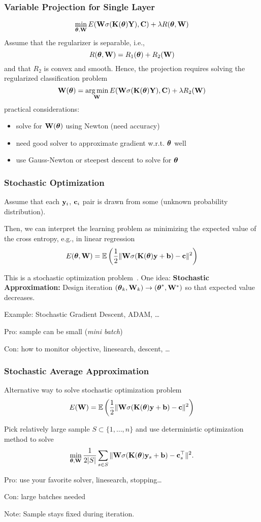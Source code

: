 \documentclass[12pt,fleqn]{beamer}
\begin{document}
\begin{frame}
	\frametitle{Variable Projection for Single Layer}
	
$$
\min_{{\boldsymbol \theta},{\bf W}} E({\bf W} \sigma({\bf K}({\boldsymbol \theta}){\bf Y} ), {\bf C}) + \lambda R({\boldsymbol \theta},{\bf W})
$$
Assume that the regularizer is separable, i.e.,
$$
 R({\boldsymbol \theta},{\bf W}) =   R_1({\boldsymbol \theta}) +  R_2({\bf W})
$$
and that $R_2$ is convex and smooth. 
\pause
Hence, the projection requires solving the regularized classification problem
$$
{\bf W}({\boldsymbol \theta}) = \operatorname*{arg\,min}_{{\bf W}} E({\bf W}\sigma({\bf K}({\boldsymbol \theta}){\bf Y}), {\bf C}) + \lambda R_2({\bf W})
$$
practical considerations:
\begin{itemize}
	\item solve for ${\bf W}({\boldsymbol \theta})$ using Newton (need accuracy)
	\item need good solver to approximate gradient w.r.t. ${\boldsymbol \theta}$  well
	\item use Gauss-Newton or steepest descent to solve for ${\boldsymbol \theta}$ 
\end{itemize}
\end{frame}

\begin{frame}\frametitle{Stochastic Optimization}
	Assume that each ${\bf y}_i$, ${\bf c}_i$ pair is drawn from some (unknown probability distribution). 
	
	Then, we can interpret the learning problem as minimizing the expected value of the cross entropy, e.g., in linear regression
	$$
		E({\boldsymbol \theta},{\bf W}) = {\mathbb{E}} \left({\frac 12} \|{\bf W} \sigma({\bf K}({\boldsymbol \theta}){\bf y} + {\bf b} ) - {\bf c}\|^2\right)
	$$
	
	This is a stochastic optimization problem~\cite{bottou2016optimization}. \pause One idea: \textbf{Stochastic Approximation: } Design iteration $({\boldsymbol \theta}_k,{\bf W}_k) \to ({\boldsymbol \theta}^*,{\bf W}^*)$ so that expected value decreases.
		
		Example: Stochastic Gradient Descent, ADAM, \ldots
		
		Pro: sample can be small (\emph{mini batch})
		
		Con: how to monitor objective, linesearch, descent, \ldots
\end{frame}
\begin{frame}
	\frametitle{Stochastic Average Approximation}
	
	Alternative way to solve stochastic optimization problem
	$$
	E({\bf W}) = {\mathbb{E}} \left({\frac 12} \| {\bf W} \sigma({\bf K}({\boldsymbol \theta}){\bf y} + {\bf b}) - {\bf c}\|^2\right)
	$$
	
	 Pick relatively large sample $S \subset \{ 1,\ldots,n\}$ and use deterministic optimization method to solve
			$$
				\min_{{\boldsymbol \theta},{\bf W}}  \frac{1}{2|S|} \sum_{s\in S} \| {\bf W} \sigma({\bf K}({\boldsymbol \theta}){\bf y}_s + {\bf b} )  - {\bf c}_s^\top \|^2.
			$$
		
			Pro: use your favorite solver, linesearch, stopping\ldots
			
			Con: large batches needed
			
			\begin{center}
				Note: Sample stays fixed during iteration.
			\end{center}
\end{frame}
\end{document}
